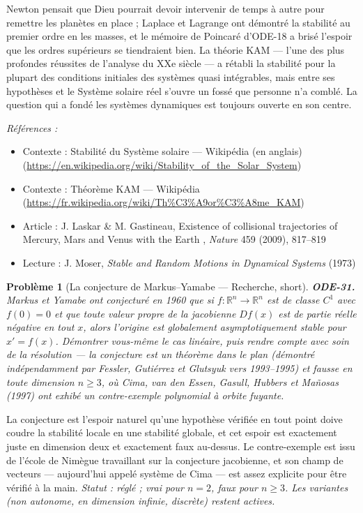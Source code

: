 \documentclass[11pt]{article}
\newtheorem{problem}{Problème}
\newenvironment{refs}{\par\small\noindent\emph{Références :}\begin{itemize}\setlength\itemsep{0pt}}{\end{itemize}\normalsize}
\begin{document}
\noindent Newton pensait que Dieu pourrait devoir intervenir de temps à autre pour
remettre les planètes en place ; Laplace et Lagrange ont démontré la stabilité au premier ordre en
les masses, et le mémoire de Poincaré d'ODE-18 a brisé l'espoir que les ordres supérieurs se
tiendraient bien. La théorie KAM --- l'une des plus profondes réussites de l'analyse du
XXe siècle --- a rétabli la stabilité \og{} pour la plupart des conditions initiales \fg{} des
systèmes quasi intégrables, mais entre ses hypothèses et le Système solaire réel s'ouvre un
fossé que personne n'a comblé. La question qui a fondé les systèmes dynamiques est toujours ouverte
en son centre.

\begin{refs}
\item Contexte : Stabilité du Système solaire --- Wikipédia (en anglais) (\url{https://en.wikipedia.org/wiki/Stability_of_the_Solar_System})
\item Contexte : Théorème KAM --- Wikipédia (\url{https://fr.wikipedia.org/wiki/Th%C3%A9or%C3%A8me_KAM})
\item Article : J. Laskar \& M. Gastineau, \og{} Existence of collisional trajectories of Mercury, Mars and Venus with the Earth \fg{}, \textit{Nature} 459 (2009), 817--819
\item Lecture : J. Moser, \textit{Stable and Random Motions in Dynamical Systems} (1973)
\end{refs}

\bigskip

\begin{problem}[{La conjecture de Markus--Yamabe --- Recherche, short}]
\textbf{ODE-31.} Markus et Yamabe ont conjecturé en 1960 que si
$ f : \mathbb{R}^n \to \mathbb{R}^n $ est de classe $ C^1 $ avec $ f(0) = 0 $ et que toute
valeur propre de la jacobienne $ Df(x) $ est de partie réelle négative en \textit{tout} $ x $,
alors l'origine est globalement asymptotiquement stable pour $ x' = f(x) $. Démontrer vous-même
le cas linéaire, puis rendre compte avec soin de la résolution --- la conjecture est un théorème
dans le plan (démontré indépendamment par Fessler, Gutiérrez et Glutsyuk vers 1993--1995) et
fausse en toute dimension $ n \ge 3 $, où Cima, van den Essen, Gasull, Hubbers et Mañosas (1997)
ont exhibé un contre-exemple polynomial à orbite fuyante.
\end{problem}

\noindent La conjecture est l'espoir naturel qu'une hypothèse vérifiée en tout point
doive coudre la stabilité locale en une stabilité globale, et cet espoir est exactement juste en
dimension deux et exactement faux au-dessus. Le contre-exemple est issu de l'école de Nimègue
travaillant sur la conjecture jacobienne, et son champ de vecteurs --- aujourd'hui appelé système de
Cima --- est assez explicite pour être vérifié à la main. \textit{Statut : réglé ; vrai pour $ n = 2 $,
faux pour $ n \ge 3 $. Les variantes (non autonome, en dimension infinie, discrète) restent
actives.}
\end{document}
